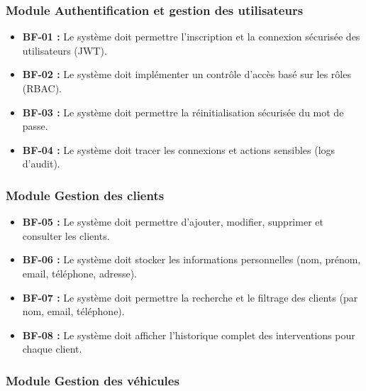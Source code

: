 \subsubsection{Module Authentification et gestion des utilisateurs}

\begin{itemize}
    \item \textbf{BF-01 :} Le système doit permettre l'inscription et la connexion sécurisée des utilisateurs (JWT).
    
    \item \textbf{BF-02 :} Le système doit implémenter un contrôle d'accès basé sur les rôles (RBAC).
    
    \item \textbf{BF-03 :} Le système doit permettre la réinitialisation sécurisée du mot de passe.
    
    \item \textbf{BF-04 :} Le système doit tracer les connexions et actions sensibles (logs d'audit).
\end{itemize}

\subsubsection{Module Gestion des clients}

\begin{itemize}
    \item \textbf{BF-05 :} Le système doit permettre d'ajouter, modifier, supprimer et consulter les clients.
    
    \item \textbf{BF-06 :} Le système doit stocker les informations personnelles (nom, prénom, email, téléphone, adresse).
    
    \item \textbf{BF-07 :} Le système doit permettre la recherche et le filtrage des clients (par nom, email, téléphone).
    
    \item \textbf{BF-08 :} Le système doit afficher l'historique complet des interventions pour chaque client.
\end{itemize}

\subsubsection{Module Gestion des véhicules}

